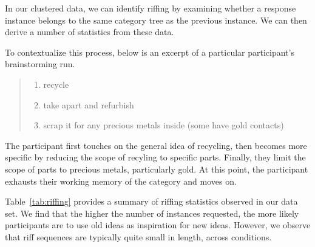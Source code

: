 In our clustered data, we can identify riffing by examining whether a response instance belongs to the same category tree as the previous instance. We can then derive a number of statistics from these data.

To contextualize this process, below is an excerpt of a particular participant's brainstorming run.

\begin{quote}
    \begin{enumerate}
        \item recycle
        \item take apart and refurbish
        \item scrap it for any precious metals inside (some have gold contacts)
    \end{enumerate}
\end{quote}

The participant first touches on the general idea of recycling, then becomes more specific by reducing the scope of recyling to specific parts. Finally, they limit the scope of parts to precious metals, particularly gold. At this point, the participant exhausts their working memory of the category and moves on.

Table~\ref{tab:riffing} provides a summary of riffing statistics observed in our data set. We find that the higher the number of instances requested, the more likely participants are to use old ideas as inspiration for new ideas. However, we observe that riff sequences are typically quite small in length, across conditions.




